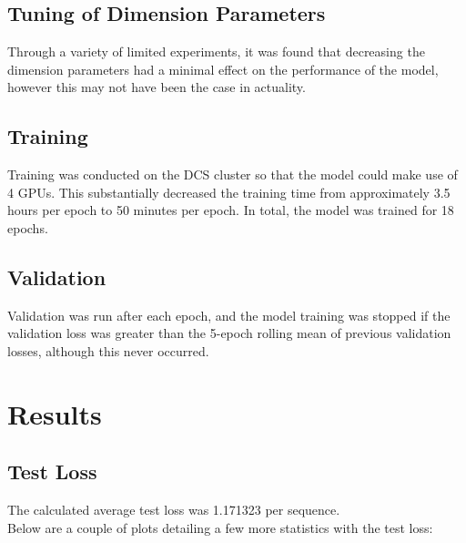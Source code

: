 \documentclass[11pt]{article}
\begin{document}
\subsection{Tuning of Dimension Parameters}
Through a variety of limited experiments, it was found that decreasing the dimension parameters had a minimal effect on the performance of the model, however this may not have been the case in actuality.

\subsection{Training}
Training was conducted on the DCS cluster so that the model could make use of 4 GPUs.  This substantially decreased the training time from approximately 3.5 hours per epoch to 50 minutes per epoch.  In total, the model was trained for 18 epochs.

\subsection{Validation}
Validation was run after each epoch, and the model training was stopped if the validation loss was greater than the 5-epoch rolling mean of previous validation losses, although this never occurred.

\section{Results}
\subsection{Test Loss}
The calculated average test loss was 1.171323 per sequence.\\[2mm]
Below are a couple of plots detailing a few more statistics with the test loss:\\[2mm]
\end{document}
